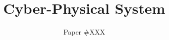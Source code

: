 \documentclass[sigconf]{aamas}  %
\begin{document}
\title{Cyber-Physical System}  %


\author{Paper \#XXX}  %

%
%
%
%
%
%
%
%
\end{document}
